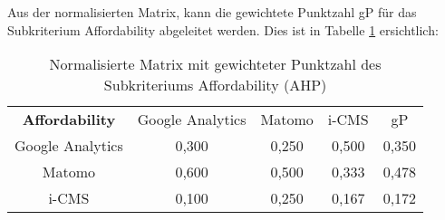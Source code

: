     Aus der normalisierten Matrix, kann die gewichtete Punktzahl gP für das Subkriterium Affordability abgeleitet werden. Dies ist in Tabelle \ref{tab:matrixAffordNormalized} ersichtlich:

    \begin{table}[h]
      \centering
      \begin{tabular}{ccccc}
        \textbf{Affordability} & Google Analytics & Matomo & i-CMS & gP \\
        Google Analytics & 0,300 & 0,250 & 0,500 & 0,350 \\
        Matomo & 0,600 & 0,500 & 0,333 & 0,478 \\
        i-CMS & 0,100 & 0,250 & 0,167 & 0,172 \\
        \end{tabular} 
      \caption{Normalisierte Matrix mit gewichteter Punktzahl des Subkriteriums Affordability (AHP)}
      \label{tab:matrixAffordNormalized}
      \end{table}

